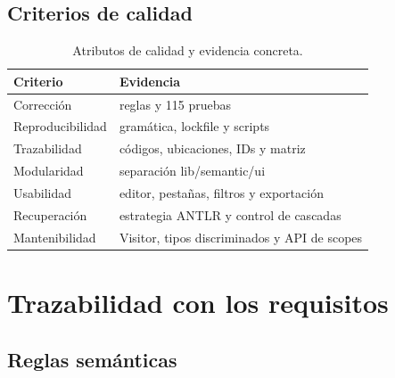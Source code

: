 \documentclass[11pt,letterpaper,oneside]{report}
\begin{document}
\section{Criterios de calidad}

\begin{table}[H]
\centering
\begin{tabularx}{\textwidth}{lY}
\toprule
Criterio & Evidencia \\
\midrule
Corrección & reglas y 115 pruebas \\
Reproducibilidad & gramática, lockfile y scripts \\
Trazabilidad & códigos, ubicaciones, IDs y matriz \\
Modularidad & separación lib/semantic/ui \\
Usabilidad & editor, pestañas, filtros y exportación \\
Recuperación & estrategia ANTLR y control de cascadas \\
Mantenibilidad & Visitor, tipos discriminados y API de scopes \\
\bottomrule
\end{tabularx}
\caption{Atributos de calidad y evidencia concreta.}
\end{table}

\chapter{Trazabilidad con los requisitos}

\section{Reglas semánticas}
\end{document}
